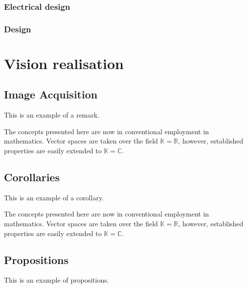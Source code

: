 \documentclass[11pt,fleqn,,a4paper,twoside,openright]{book} %
\begin{document}
\subsection{Electrical design}

\subsection{Design}

\chapter{Vision realisation}

\section{Image Acquisition}

This is an example of a remark.

\begin{remark}
The concepts presented here are now in conventional employment in mathematics. Vector spaces are taken over the field $\mathbb{K}=\mathbb{R}$, however, established properties are easily extended to $\mathbb{K}=\mathbb{C}$.
\end{remark}


\section{Corollaries}

This is an example of a corollary.

\begin{corollary}
The concepts presented here are now in conventional employment in mathematics. Vector spaces are taken over the field $\mathbb{K}=\mathbb{R}$, however, established properties are easily extended to $\mathbb{K}=\mathbb{C}$.
\end{corollary}


\section{Propositions}

This is an example of propositions.
\end{document}
